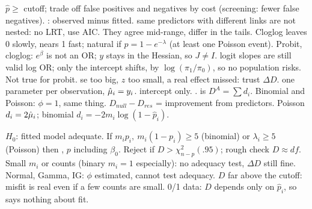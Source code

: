 \sk{} $\hat p\ge$ cutoff; trade off false positives and negatives by cost (screening: fewer false negatives).
\sk{} : observed minus fitted.
\sk{} same predictors with different links are not nested: no LRT, use AIC. They agree mid-range, differ in the tails. Cloglog leaves 0 slowly, nears 1 fast; natural if $p=1-e^{-\lambda}$ (at least one Poisson event). Probit, cloglog: $e^\beta$ is not an OR; $y$ stays in the Hessian, so $J\ne I$.
\sk{} logit slopes are still valid log OR; only the intercept shifts, by $\log(\pi_1/\pi_0)$, so no population risks. Not true for probit.
\sk{} se too big, $z$ too small, a real effect missed: trust $\Delta D$.
  one parameter per observation, $\hat{\mu}_i=y_i$.  intercept only.  .  is $D^A=\sum d_i$. Binomial and Poisson: $\phi=1$, same thing. $D_{null}-D_{res}$ = improvement from predictors.
\sk{} Poisson $d_i=2\hat{\mu}_i$; binomial $d_i=-2m_i\log(1-\hat p_i)$.
\par
{} $H_0$: fitted model adequate. If $m_ip_i,\ m_i(1-p_i)\ge5$ (binomial) or $\lambda_i\ge5$ (Poisson) then , $p$ including $\beta_0$. Reject if $D>\chi^2_{n-p}(.95)$; rough check $D\approx df$.  Small $m_i$ or counts (binary $m_i=1$ especially): no adequacy test, $\Delta D$ still fine. Normal, Gamma, IG: $\phi$ estimated, cannot test adequacy. $D$ far above the cutoff: misfit is real even if a few counts are small. 0/1 data: $D$ depends only on $\hat p_i$, so says nothing about fit.
